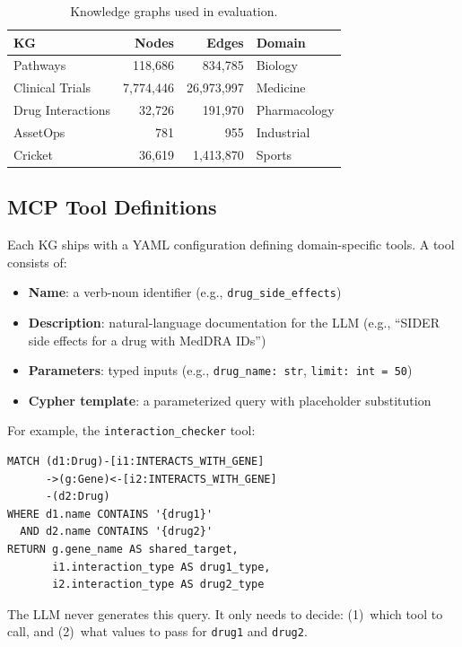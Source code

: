 \documentclass[sigconf, anonymous, review]{acmart}
\begin{document}
\begin{table}[t]
\centering
\caption{Knowledge graphs used in evaluation.}
\label{tab:kgs}
\small
\begin{tabular}{@{}lrrl@{}}
\toprule
\textbf{KG} & \textbf{Nodes} & \textbf{Edges} & \textbf{Domain} \\
\midrule
Pathways        & 118,686   &    834,785 & Biology \\
Clinical Trials & 7,774,446 & 26,973,997 & Medicine \\
Drug Interactions & 32,726  &    191,970 & Pharmacology \\
AssetOps        &       781 &        955 & Industrial \\
Cricket         &    36,619 &  1,413,870 & Sports \\
\bottomrule
\end{tabular}
\end{table}

\subsection{MCP Tool Definitions}

Each KG ships with a YAML configuration defining domain-specific
tools.  A tool consists of:

\begin{itemize}
\item \textbf{Name}: a verb-noun identifier (e.g.,
  \texttt{drug\_side\_effects})
\item \textbf{Description}: natural-language documentation for the
  LLM (e.g., ``SIDER side effects for a drug with MedDRA IDs'')
\item \textbf{Parameters}: typed inputs (e.g.,
  \texttt{drug\_name: str}, \texttt{limit: int = 50})
\item \textbf{Cypher template}: a parameterized query with
  placeholder substitution
\end{itemize}

For example, the \texttt{interaction\_checker} tool:

\begin{lstlisting}
MATCH (d1:Drug)-[i1:INTERACTS_WITH_GENE]
      ->(g:Gene)<-[i2:INTERACTS_WITH_GENE]
      -(d2:Drug)
WHERE d1.name CONTAINS '{drug1}'
  AND d2.name CONTAINS '{drug2}'
RETURN g.gene_name AS shared_target,
       i1.interaction_type AS drug1_type,
       i2.interaction_type AS drug2_type
\end{lstlisting}

The LLM never generates this query.  It only needs to decide:
(1)~which tool to call, and (2)~what values to pass for
\texttt{drug1} and \texttt{drug2}.
\end{document}

